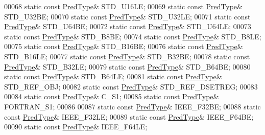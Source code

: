 \begin{DoxyCode}
00068         \textcolor{keyword}{static} \textcolor{keyword}{const} \hyperlink{class_h5_1_1_pred_type}{PredType}& STD\_U16LE;
00069         \textcolor{keyword}{static} \textcolor{keyword}{const} \hyperlink{class_h5_1_1_pred_type}{PredType}& STD\_U32BE;
00070         \textcolor{keyword}{static} \textcolor{keyword}{const} \hyperlink{class_h5_1_1_pred_type}{PredType}& STD\_U32LE;
00071         \textcolor{keyword}{static} \textcolor{keyword}{const} \hyperlink{class_h5_1_1_pred_type}{PredType}& STD\_U64BE;
00072         \textcolor{keyword}{static} \textcolor{keyword}{const} \hyperlink{class_h5_1_1_pred_type}{PredType}& STD\_U64LE;
00073         \textcolor{keyword}{static} \textcolor{keyword}{const} \hyperlink{class_h5_1_1_pred_type}{PredType}& STD\_B8BE;
00074         \textcolor{keyword}{static} \textcolor{keyword}{const} \hyperlink{class_h5_1_1_pred_type}{PredType}& STD\_B8LE;
00075         \textcolor{keyword}{static} \textcolor{keyword}{const} \hyperlink{class_h5_1_1_pred_type}{PredType}& STD\_B16BE;
00076         \textcolor{keyword}{static} \textcolor{keyword}{const} \hyperlink{class_h5_1_1_pred_type}{PredType}& STD\_B16LE;
00077         \textcolor{keyword}{static} \textcolor{keyword}{const} \hyperlink{class_h5_1_1_pred_type}{PredType}& STD\_B32BE;
00078         \textcolor{keyword}{static} \textcolor{keyword}{const} \hyperlink{class_h5_1_1_pred_type}{PredType}& STD\_B32LE;
00079         \textcolor{keyword}{static} \textcolor{keyword}{const} \hyperlink{class_h5_1_1_pred_type}{PredType}& STD\_B64BE;
00080         \textcolor{keyword}{static} \textcolor{keyword}{const} \hyperlink{class_h5_1_1_pred_type}{PredType}& STD\_B64LE;
00081         \textcolor{keyword}{static} \textcolor{keyword}{const} \hyperlink{class_h5_1_1_pred_type}{PredType}& STD\_REF\_OBJ;
00082         \textcolor{keyword}{static} \textcolor{keyword}{const} \hyperlink{class_h5_1_1_pred_type}{PredType}& STD\_REF\_DSETREG;
00083 
00084         \textcolor{keyword}{static} \textcolor{keyword}{const} \hyperlink{class_h5_1_1_pred_type}{PredType}& C\_S1;
00085         \textcolor{keyword}{static} \textcolor{keyword}{const} \hyperlink{class_h5_1_1_pred_type}{PredType}& FORTRAN\_S1;
00086 
00087         \textcolor{keyword}{static} \textcolor{keyword}{const} \hyperlink{class_h5_1_1_pred_type}{PredType}& IEEE\_F32BE;
00088         \textcolor{keyword}{static} \textcolor{keyword}{const} \hyperlink{class_h5_1_1_pred_type}{PredType}& IEEE\_F32LE;
00089         \textcolor{keyword}{static} \textcolor{keyword}{const} \hyperlink{class_h5_1_1_pred_type}{PredType}& IEEE\_F64BE;
00090         \textcolor{keyword}{static} \textcolor{keyword}{const} \hyperlink{class_h5_1_1_pred_type}{PredType}& IEEE\_F64LE;

\end{DoxyCode}

